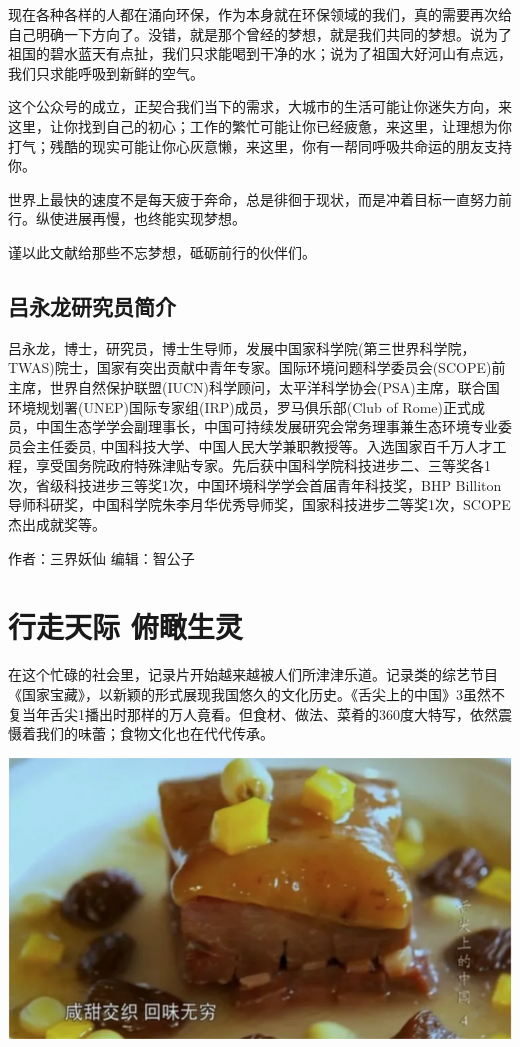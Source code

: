 \documentclass[
]{book}
\begin{document}
现在各种各样的人都在涌向环保，作为本身就在环保领域的我们，真的需要再次给自己明确一下方向了。没错，就是那个曾经的梦想，就是我们共同的梦想。说为了祖国的碧水蓝天有点扯，我们只求能喝到干净的水；说为了祖国大好河山有点远，我们只求能呼吸到新鲜的空气。

这个公众号的成立，正契合我们当下的需求，大城市的生活可能让你迷失方向，来这里，让你找到自己的初心；工作的繁忙可能让你已经疲惫，来这里，让理想为你打气；残酷的现实可能让你心灰意懒，来这里，你有一帮同呼吸共命运的朋友支持你。

世界上最快的速度不是每天疲于奔命，总是徘徊于现状，而是冲着目标一直努力前行。纵使进展再慢，也终能实现梦想。

谨以此文献给那些不忘梦想，砥砺前行的伙伴们。

\hypertarget{ux5415ux6c38ux9f99ux7814ux7a76ux5458ux7b80ux4ecb}{%
\subsection{吕永龙研究员简介}\label{ux5415ux6c38ux9f99ux7814ux7a76ux5458ux7b80ux4ecb}}

吕永龙，博士，研究员，博士生导师，发展中国家科学院(第三世界科学院，TWAS)院士，国家有突出贡献中青年专家。国际环境问题科学委员会(SCOPE)前主席，世界自然保护联盟(IUCN)科学顾问，太平洋科学协会(PSA)主席，联合国环境规划署(UNEP)国际专家组(IRP)成员，罗马俱乐部(Club of Rome)正式成员，中国生态学学会副理事长，中国可持续发展研究会常务理事兼生态环境专业委员会主任委员, 中国科技大学、中国人民大学兼职教授等。入选国家百千万人才工程，享受国务院政府特殊津贴专家。先后获中国科学院科技进步二、三等奖各1次，省级科技进步三等奖1次，中国环境科学学会首届青年科技奖，BHP Billiton导师科研奖，中国科学院朱李月华优秀导师奖，国家科技进步二等奖1次，SCOPE杰出成就奖等。

作者：三界妖仙
编辑：智公子

\hypertarget{ux884cux8d70ux5929ux9645-ux4fefux77b0ux751fux7075}{%
\section{行走天际 俯瞰生灵}\label{ux884cux8d70ux5929ux9645-ux4fefux77b0ux751fux7075}}

在这个忙碌的社会里，记录片开始越来越被人们所津津乐道。记录类的综艺节目《国家宝藏》，以新颖的形式展现我国悠久的文化历史。《舌尖上的中国》3虽然不复当年舌尖1播出时那样的万人竟看。但食材、做法、菜肴的360度大特写，依然震慑着我们的味蕾；食物文化也在代代传承。

\includegraphics[width=8.33in]{images/xf1}
\end{document}
